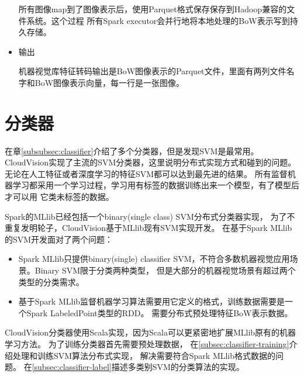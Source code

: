 \begin{itemize}
        所有图像map到了图像表示后，使用Parquet格式保存保存到Hadoop兼容的文件系统。这个过程
        所有Spark executor会并行地将本地处理的BoW表示写到持久存储。

      
  \item 输出

        机器视觉库特征转码输出是BoW图像表示的Parquet文件，里面有两列文件名字和BoW图像表示向量，每一行是一张图像。

\end{itemize}


\section{分类器}
\label{sec:cloudvision_classifier}
在章\ref{subsubsec:classifier}介绍了多个分类器，但是发现SVM是最常用。
CloudVision实现了主流的SVM分类器，这里说明分布式实现方式和碰到的问题。
无论在人工特征或者深度学习的特征SVM都可以达到最先进的结果。
所有监督机器学习都采用一个学习过程，学习用有标签的数据训练出来一个模型，有了模型后才可以用
它类未标签的数据。


Spark的MLlib已经包括一个binary(single class) SVM分布式分类器实现，
为了不重复发明轮子，CloudVision基于MLlib现有SVM实现开发。
在基于Spark MLlib的SVM开发面对了两个问题：
\begin{itemize}
  \item Spark MLlib只提供binary(single) classifier SVM，不符合多数机器视觉应用场景。Binary SVM限于分类两种类型，
        但是大部分的机器视觉场景有超过两个类型的分类需求。
  \item 基于Spark MLlib监督机器学习算法需要用它定义的格式，训练数据需要是一个Spark LabeledPoint类型的RDD。
        需要分布式预处理特征BoW表示数据。
\end{itemize}

CloudVision分类器使用Scala实现，因为Scala可以更紧密地扩展MLlib原有的机器学习方法。
为了训练分类器首先需要预处理数据，
在\ref{subsec:classifier-training}介绍处理和训练SVM算法分布式实现，
解决需要符合Spark MLlib格式数据的问题。
在\ref{subsec:classifier-label}描述多类别SVM的分类算法的实现。


